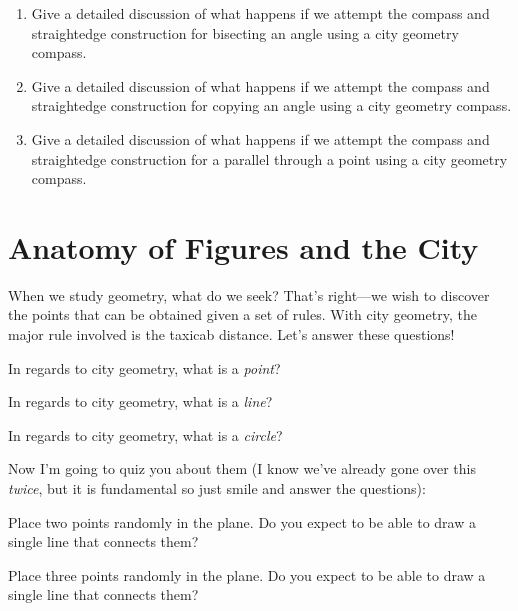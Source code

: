 \begin{problems}
\begin{enumerate}
\item Give a detailed discussion of what happens if we attempt the
  compass and straightedge construction for bisecting an angle using a
  city geometry compass.

\item Give a detailed discussion of what happens if we attempt the
  compass and straightedge construction for copying an angle using a
  city geometry compass.

\item Give a detailed discussion of what happens if we attempt the
  compass and straightedge construction for a parallel through a point
  using a city geometry compass.
\end{enumerate}
\end{problems}

\newpage


\section{Anatomy of Figures and the City}

When we study geometry, what do we seek? That's right---we wish to
discover the points that can be obtained given a set of rules. With
city geometry, the major rule involved is the taxicab distance. Let's
answer these questions!

\begin{question} 
In regards to city geometry, what is a \textit{point}?
\end{question}
\QM

\begin{question}
In regards to city geometry, what is a \textit{line}?
\end{question}
\QM


\begin{question}
In regards to city geometry, what is a \textit{circle}?
\end{question}
\QM


Now I'm going to quiz you about them (I know we've already gone over
this \textit{twice}, but it is fundamental so just smile and answer
the questions):

\begin{question} 
Place two points randomly in the plane. Do you expect to be able to
draw a single line that connects them?
\end{question}
\QM

\begin{question} 
Place three points randomly in the plane. Do you expect to be able to
draw a single line that connects them?
\end{question}
\QM

